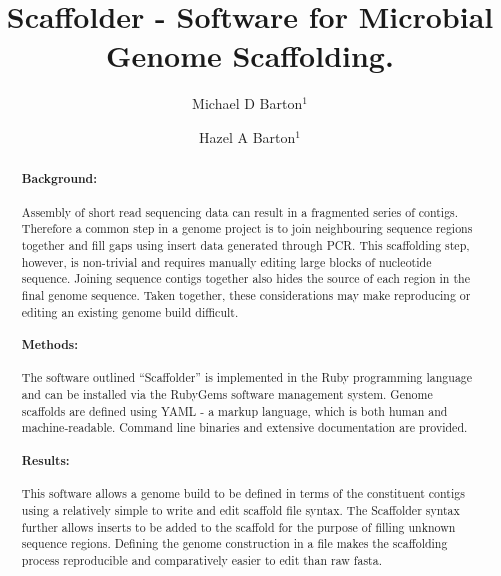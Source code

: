 \documentclass[10pt]{bmc_article}
\newenvironment{bmcformat}{\begin{raggedright}\baselineskip20pt\sloppy\setboolean{publ}{false}}{\end{raggedright}\baselineskip20pt\sloppy}
\begin{document}
\begin{bmcformat}

\title{Scaffolder - Software for Microbial Genome Scaffolding.} %

\author{
  Michael D Barton$^{1}$%
\and
  Hazel A Barton\correspondingauthor$^1$%
      }

\address{\iid(1) Department of Biological Sciences, Northern Kentucky%
University, Nunn Drive, Highland Heights, KY 41076 }%

\maketitle

\begin{abstract} %

  \paragraph*{Background:} Assembly of short read sequencing data can result in
  a fragmented series of contigs. Therefore a common step in a genome project
  is to join neighbouring sequence regions together and fill gaps using insert
  data generated through PCR. This scaffolding step, however, is non-trivial
  and requires manually editing large blocks of nucleotide sequence. Joining
  sequence contigs together also hides the source of each region in the final
  genome sequence. Taken together, these considerations may make reproducing or
  editing an existing genome build difficult.

  \paragraph*{Methods:} The software outlined ``Scaffolder'' is implemented in
  the Ruby programming language and can be installed via the RubyGems software
  management system. Genome scaffolds are defined using YAML - a markup
  language, which is both human and machine-readable. Command line binaries and
  extensive documentation are provided.

  \paragraph*{Results:} This software allows a genome build to be defined in
  terms of the constituent contigs using a relatively simple to write and edit
  scaffold file syntax. The Scaffolder syntax further allows inserts to be
  added to the scaffold for the purpose of filling unknown sequence regions.
  Defining the genome construction in a file makes the scaffolding process
  reproducible and comparatively easier to edit than raw fasta.


\end{abstract}
\end{bmcformat}
\end{document}
